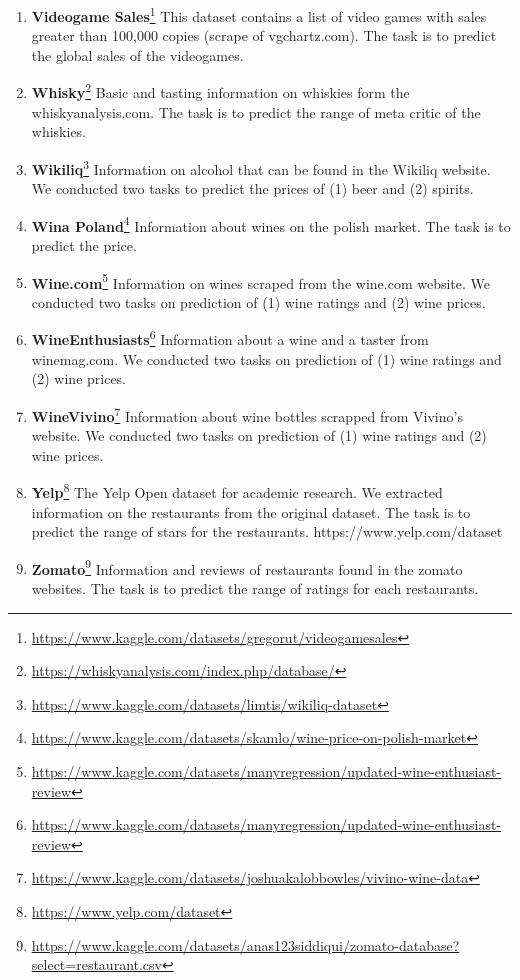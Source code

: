 \documentclass{article}
\theoremstyle{plain}
\theoremstyle{definition}
\theoremstyle{remark}
\begin{document}
\begin{enumerate}
    \item  \textbf{Videogame Sales}\footnote{\url{https://www.kaggle.com/datasets/gregorut/videogamesales}} This dataset contains a list of video games with sales greater than 100,000 copies (scrape of vgchartz.com). The task is to predict the global sales of the videogames.
    \item  \textbf{Whisky}\footnote{\url{https://whiskyanalysis.com/index.php/database/}} Basic and tasting information on whiskies form the whiskyanalysis.com. The task is to predict the range of meta critic of the whiskies.
    \item  \textbf{Wikiliq}\footnote{\url{https://www.kaggle.com/datasets/limtis/wikiliq-dataset}} Information on alcohol that can be found in the Wikiliq website. We conducted two tasks to predict the prices of (1) beer and (2) spirits. 
    \item  \textbf{Wina Poland}\footnote{\url{https://www.kaggle.com/datasets/skamlo/wine-price-on-polish-market}} Information about wines on the polish market. The task is to predict the price.
    \item  \textbf{Wine.com}\footnote{\url{https://www.kaggle.com/datasets/manyregression/updated-wine-enthusiast-review}} Information on wines scraped from the wine.com website. We conducted two tasks on prediction of (1) wine ratings and (2) wine prices.
    \item  \textbf{WineEnthusiasts}\footnote{\url{https://www.kaggle.com/datasets/manyregression/updated-wine-enthusiast-review}} Information about a wine and a taster from winemag.com. We conducted two tasks on prediction of (1) wine ratings and (2) wine prices.
    \item  \textbf{WineVivino}\footnote{\url{https://www.kaggle.com/datasets/joshuakalobbowles/vivino-wine-data}} Information about wine bottles scrapped from Vivino's website. We conducted two tasks on prediction of (1) wine ratings and (2) wine prices.
    \item  \textbf{Yelp}\footnote{\url{https://www.yelp.com/dataset}} The Yelp Open dataset for academic research. We extracted information on the restaurants from the original dataset. The task is to predict the range of stars for the restaurants. 
    https://www.yelp.com/dataset
    \item \textbf{Zomato}\footnote{\url{https://www.kaggle.com/datasets/anas123siddiqui/zomato-database?select=restaurant.csv}} Information and reviews of restaurants found in the zomato websites. The task is to predict the range of ratings for each restaurants.    
\end{enumerate}
\end{document}
